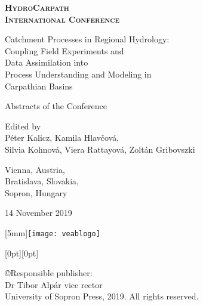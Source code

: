 \documentclass[10pt,a5paper,twoside]{book}
\begin{document}
\newcommand{\abstrtitle}[1]{\Large \textbf{\textsc{#1}}\normalsize \smallskip}
\newcommand{\name}[1]{\textbf{\textsc{#1}}\smallskip}
\newcommand{\institute}[1]{\footnotesize #1}
\newcommand{\email}[1]{\texttt{#1}\normalsize}

\begin{titlepage}
\centering
\scshape
\large
\bfseries
HydroCarpath \\
International Conference

\vspace{0.5cm}
Catchment Processes in Regional Hydrology:\\
Coupling Field Experiments and\\
Data Assimilation into\\
Process Understanding and Modeling in\\
Carpathian Basins
\upshape
\normalsize
\mdseries

\vspace{1cm}
Abstracts of the Conference

\vspace{3cm}
Edited by\\
Péter Kalicz, Kamila Hlavčová,\\
Silvia Kohnová, Viera Rattayová, Zoltán Gribovszki


\vfill
Vienna, Austria, \\
Bratislava, Slovakia, \\
Sopron, Hungary

14 November 2019
\end{titlepage}

\newpage{}
\thispagestyle{empty}
\hspace*{\fill} \hspace{4mm} \raisebox{-11mm}[5mm]{\texttt{[image: veablogo]}}


\vspace*{\fill}

\hspace*{\fill} \hspace{1mm} \raisebox{0mm}[0pt][0pt]{}

\noindent{}\copyright{\footnotesize{}Responsible publisher:\\ Dr Tibor Alpár vice rector\\ University of Sopron Press, 2019. All rights reserved.} %
\end{document}

